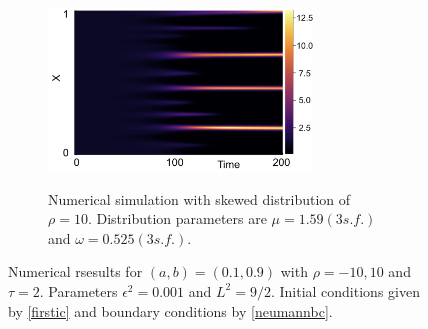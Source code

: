 \begin{figure}[H]
\begin{subfigure}[t]{0.45\textwidth}
    \end{subfigure}
    \hfill
    \begin{subfigure}[t]{0.45\textwidth}
        \centering
        \includegraphics[width=7cm,height=5cm]{skewt210.png}
        \caption{Numerical simulation with skewed distribution of $\rho=10$. Distribution parameters are $\mu=1.59(3 s.f.)$ and $\omega=0.525(3 s.f.)$.}
        \label{}
    \end{subfigure}
    \caption{Numerical rsesults for $(a,b)=(0.1,0.9)$ with $\rho=-10,10$ and $\tau=2$. Parameters $\epsilon^2=0.001$ and $L^2=9/2$. Initial conditions given by \eqref{firstic} and boundary conditions by \eqref{neumannbc}.}
    \label{fig:linskew2}
\end{figure}

